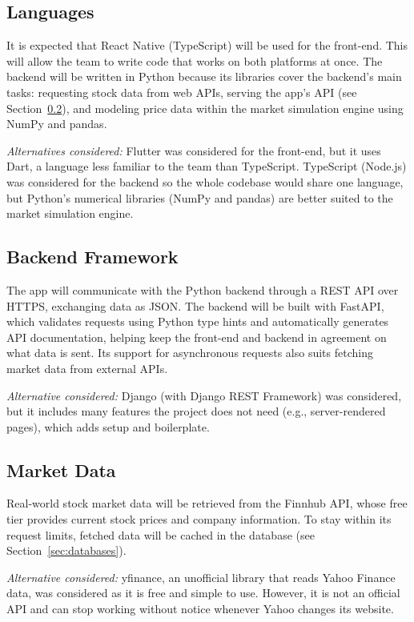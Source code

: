 \documentclass{article}
\begin{document}
\subsection{Languages}
It is expected that React Native (TypeScript) will be used for the front-end. This will allow the team to write code that works on both platforms at once.
The backend will be written in Python because its libraries cover the backend's main tasks: requesting stock data from web APIs, serving the app's API (see Section~\ref{SecBackendFramework}), and modeling
price data within the market simulation engine using NumPy and pandas.

\textit{Alternatives considered:} Flutter was considered for the front-end, but it uses Dart, a language less familiar to the team than TypeScript.
TypeScript (Node.js) was considered for the backend so the whole codebase would share one language, but Python's numerical libraries (NumPy and pandas) are better suited to the market simulation engine.

\subsection{Backend Framework} \label{SecBackendFramework}
The app will communicate with the Python backend through a REST API over HTTPS, exchanging data as JSON. The backend will be built with FastAPI, which validates requests using Python type hints
and automatically generates API documentation, helping keep the front-end and backend in agreement on what data is sent. Its support for asynchronous requests also suits fetching market data from external APIs.

\textit{Alternative considered:} Django (with Django REST Framework) was considered, but it includes many features the project does not need (e.g., server-rendered pages), which adds setup and boilerplate.

\subsection{Market Data}
Real-world stock market data will be retrieved from the Finnhub API, whose free tier provides current stock prices and company information. To stay within its request limits, fetched data will be
cached in the database (see Section~\ref{sec:databases}).

\textit{Alternative considered:} yfinance, an unofficial library that reads Yahoo Finance data, was considered as it is free and simple to use. However, it is not an official API and can stop working
without notice whenever Yahoo changes its website.
\end{document}
